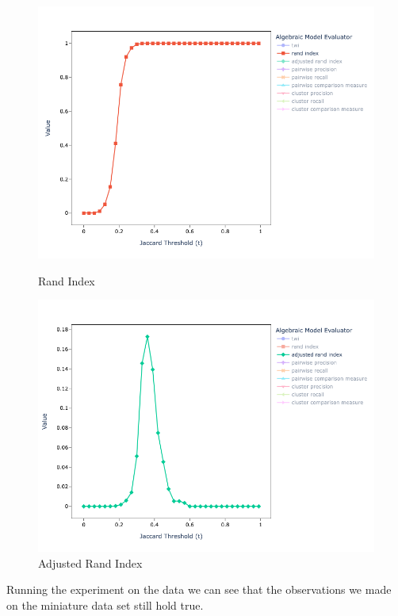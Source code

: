 \documentclass[lettersize,journal]{IEEEtran}
\begin{document}
\begin{figure}[h!]
\begin{minipage}{0.49\textwidth}
            \includegraphics[width=\textwidth]{full-alg-rand}
            \caption{Rand Index}
            \label{fig:full-alg-rand}
        \end{minipage}    
        \begin{minipage}{0.49\textwidth}
            \centering
            \includegraphics[width=\textwidth]{full-alg-adj-rand}
            \caption{Adjusted Rand Index}
            \label{fig:full-alg-adj-rand}
        \end{minipage}    
    \end{figure}\label{abt-buy-full}
    
    Running the experiment on the data we can see that the observations we made
    on the miniature data set still hold true.
\end{document}
